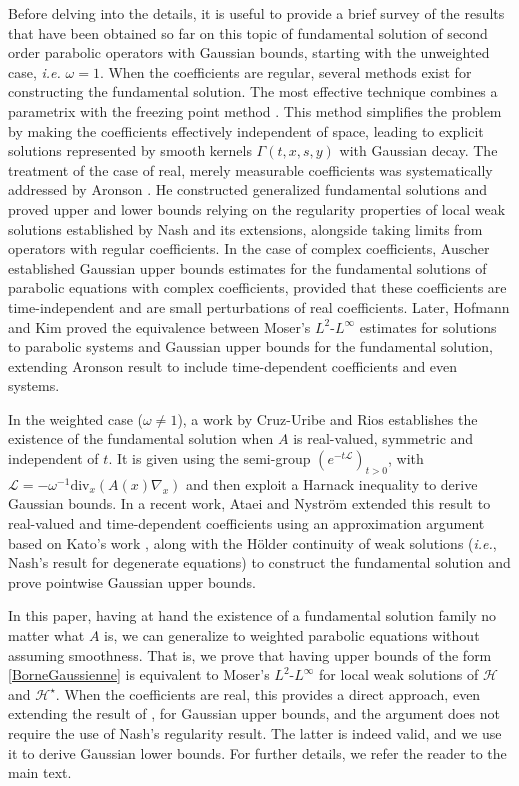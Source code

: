 \documentclass[12pt, letterpaper]{amsart}
\theoremstyle{definition}
\theoremstyle{remark}
\numberwithin{equation}{section}
\begin{document}
Before delving into the details, it is useful to provide a brief survey of the results that have been obtained so far on this topic of fundamental solution of second order parabolic operators with Gaussian bounds, starting with the unweighted case, \textit{i.e.} $\omega = 1$. When the coefficients are regular, several methods exist for constructing the fundamental solution. The most effective technique combines a parametrix with the freezing point method \cite{friedman2008partial}. This method simplifies the problem by making the coefficients effectively independent of space, leading to explicit solutions represented by smooth kernels $\Gamma(t, x, s, y)$ with Gaussian decay. The treatment of the case of real, merely measurable coefficients was systematically addressed by Aronson \cite{aronson1967bounds, aronson1968non}. He constructed generalized fundamental solutions and proved upper and lower bounds relying on the regularity properties of local weak solutions established by Nash \cite{nash1958continuity} and its extensions, alongside taking limits from operators with regular coefficients. In the case of complex coefficients, Auscher \cite{auscher1996regularity} established Gaussian upper bounds estimates for the fundamental solutions of parabolic equations with complex coefficients, provided that these coefficients are time-independent and are small perturbations of real coefficients. Later, Hofmann and Kim \cite{hofmann2004gaussian} proved the equivalence between Moser’s $L^2$-$L^\infty$ estimates for solutions to parabolic systems and Gaussian upper bounds for the fundamental solution, extending Aronson result to include time-dependent coefficients and even systems. 

In the weighted case ($\omega \neq 1$), a work by Cruz-Uribe and Rios \cite{cruz2014corrigendum} establishes the existence of the fundamental solution when $A$ is real-valued, symmetric and independent of $t$. It is given using the semi-group $(e^{-t\mathcal{L}})_{t>0}$, with $\mathcal{L}=-\omega^{-1} \mathrm{div}_x(A(x)\nabla_x )$ and then exploit a Harnack inequality to derive Gaussian bounds. In a recent work, Ataei and Nystr\"om \cite{ataei2024fundamental} extended this result to real-valued and time-dependent coefficients using an approximation argument based on Kato's work \cite{kato1961abstract}, along with the H\"older continuity of weak solutions (\textit{i.e.}, Nash's result for degenerate equations) to construct the fundamental solution and prove pointwise Gaussian upper bounds.

In this paper, having at hand the existence of a fundamental solution family no matter what $A$ is, we can generalize \cite{hofmann2004gaussian} to weighted parabolic equations without assuming smoothness. That is, we prove that having upper bounds of the form \eqref{BorneGaussienne} is equivalent to Moser’s $L^2$-$L^\infty$ for local weak solutions of $\mathcal{H}$ and $\mathcal{H}^\star$. When the coefficients are real, this provides a direct approach, even extending the result of \cite{ataei2024fundamental}, for Gaussian upper bounds, and the argument does not require the use of Nash's regularity result. The latter is indeed valid, and we use it to derive Gaussian lower bounds. For further details, we refer the reader to the main text.
\end{document}
